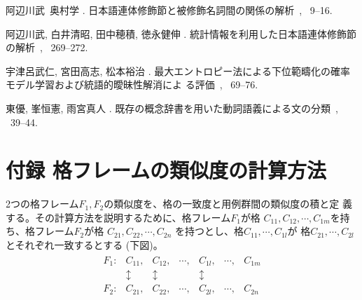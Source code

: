 \documentclass[fleqn]{nlp}
\begin{document}
\begin{thebibliography}{}
阿辺川武\BBACOMMA\  奥村学 \BBCP.
\newblock \JBOQ 日本語連体修飾節と被修飾名詞間の関係の解析\JBCQ\
\newblock {}, \BPGS\ 9--16.

阿辺川武, 白井清昭, 田中穂積, 徳永健伸 \BBCP.
\newblock \JBOQ 統計情報を利用した日本語連体修飾節の解析\JBCQ\
\newblock {}, \BPGS\ 269--272.

宇津呂武仁, 宮田高志, 松本裕治 \BBCP.
\newblock \JBOQ
  最大エントロピー法による下位範疇化の確率モデル学習および統語的曖昧性解消によ
る評価\JBCQ\
\newblock {}, \BPGS\ 69--76.

東優, 峯恒憲, 雨宮真人 \BBOP 1996\BBCP.
\newblock \JBOQ 既存の概念辞書を用いた動詞語義による文の分類\JBCQ\
\newblock {},
  \BPGS\ 39--44.

\end{thebibliography}


\appendix

\section*{付録 格フレームの類似度の計算方法}

2つの格フレーム$F_1,F_2$の類似度を、格の一致度と用例群間の類似度の積と定
義する。その計算方法を説明するために、格フレーム$F_1$が格
$C_{11},C_{12},\cdots,C_{1m}$を持ち、格フレーム$F_2$が格
$C_{21},C_{22},\cdots,C_{2n}$ を持つとし、格$C_{11}, \cdots, C_{1l} $が
格$C_{21}, \cdots, C_{2l}$とそれぞれ一致するとする (下図)。
\begin{eqnarray*}
 \begin{array}{ccccccc}
  F_1 : & C_{11}, & C_{12}, & \cdots, & C_{1l}, & \cdots, & C_{1m} \\
        & \updownarrow & \updownarrow  & & \updownarrow \\
  F_2 : & C_{21}, & C_{22}, & \cdots, & C_{2l}, & \cdots, & C_{2n}
 \end{array}
\end{eqnarray*}
\end{document}
